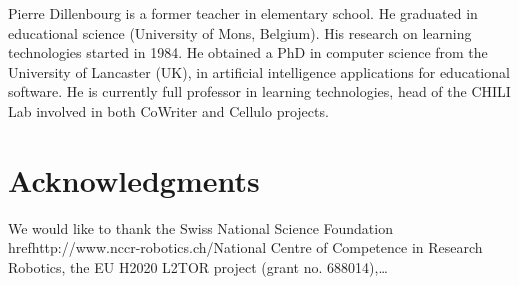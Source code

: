 \documentclass{sig-alternate-05-2015}
\begin{document}
Pierre Dillenbourg is a former teacher in elementary school. He graduated in educational science (University of Mons, Belgium). His research on learning technologies started in 1984. He obtained a PhD in computer science from the University of Lancaster (UK), in artificial intelligence applications for educational software. He is currently full professor in learning technologies, head of the CHILI Lab involved in both CoWriter and Cellulo projects.

\section{Acknowledgments}
We would like to thank the Swiss National Science Foundation 
href{http://www.nccr-robotics.ch/}{National Centre of Competence in Research 
Robotics}, the EU H2020 L2TOR project (grant no. 688014),\dots


  
\end{document}

